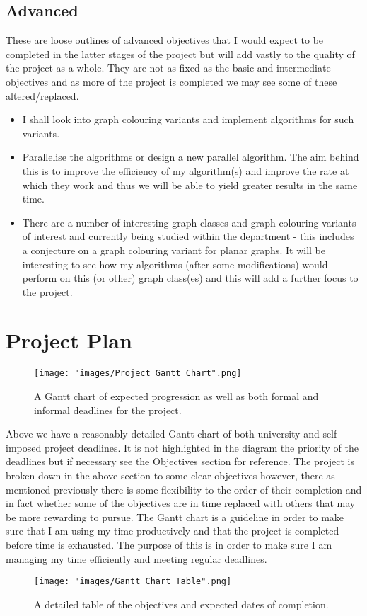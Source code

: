 \documentclass[12pt, a4paper]{article}
\begin{document}
\subsection*{Advanced}
These are loose outlines of advanced objectives that I would expect to be completed in the latter stages of the project but will add vastly to the quality of the project as a whole. They are not as fixed as the basic and intermediate objectives and as more of the project is completed we may see some of these altered/replaced.
\begin{itemize}
\renewcommand\labelitemi{\tiny$\bullet$}
\item I shall look into graph colouring variants and implement algorithms for such variants.
\item Parallelise the algorithms or design a new parallel algorithm. The aim behind this is to improve the efficiency of my algorithm(s) and improve the rate at which they work and thus we will be able to yield greater results in the same time.
\item There are a number of interesting graph classes and graph colouring variants of interest and currently being studied within the department - this includes a conjecture on a graph colouring variant for planar graphs. It will be interesting to see how my algorithms (after some modifications) would perform on this (or other) graph class(es) and this will add a further focus to the project.
\end{itemize}  
\newpage
\section*{Project Plan}
\begin{figure}[h]
\texttt{[image: "images/Project Gantt Chart".png]}
\caption*{A Gantt chart of expected progression as well as both formal and informal deadlines for the project.}
\end{figure}
Above we have a reasonably detailed Gantt chart of both university and self-imposed project deadlines. It is not highlighted in the diagram the priority of the deadlines but if necessary see the Objectives section for reference. The project is broken down in the above section to some clear objectives however, there as mentioned previously there is some flexibility to the order of their completion and in fact whether some of the objectives are in time replaced with others that may be more rewarding to pursue. The Gantt chart is a guideline in order to make sure that I am using my time productively and that the project is completed before time is exhausted. The purpose of this is in order to make sure I am managing my time efficiently and meeting regular deadlines.
\begin{figure}[t]
\texttt{[image: "images/Gantt Chart Table".png]}
\caption*{A detailed table of the objectives and expected dates of completion.}
\end{figure}
\end{document}
